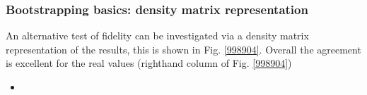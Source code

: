 \subsubsection{Bootstrapping basics: density matrix representation}

An alternative test of fidelity can be investigated via a density matrix representation of the results, this is shown in Fig. \ref{998904}. Overall the agreement is excellent for the real values (righthand column of Fig. \ref{998904})

\begin{itemize}
\item 
\end{itemize}